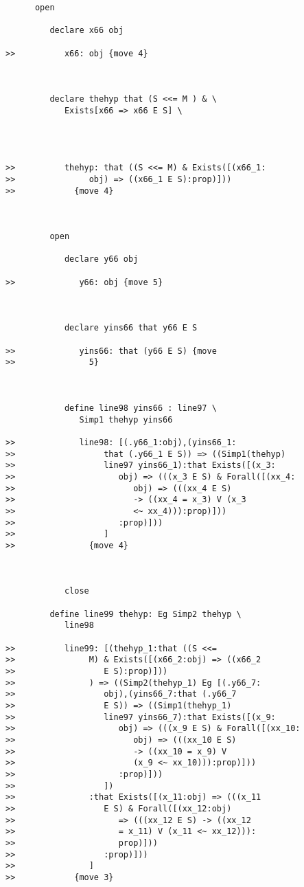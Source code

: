 \documentclass[12pt]{article}
\begin{document}
\begin{verbatim}
      open

         declare x66 obj

>>          x66: obj {move 4}



         declare thehyp that (S <<= M ) & \
            Exists[x66 => x66 E S] \
            



>>          thehyp: that ((S <<= M) & Exists([(x66_1:
>>               obj) => ((x66_1 E S):prop)]))
>>            {move 4}



         open

            declare y66 obj

>>             y66: obj {move 5}



            declare yins66 that y66 E S

>>             yins66: that (y66 E S) {move
>>               5}



            define line98 yins66 : line97 \
               Simp1 thehyp yins66

>>             line98: [(.y66_1:obj),(yins66_1:
>>                  that (.y66_1 E S)) => ((Simp1(thehyp)
>>                  line97 yins66_1):that Exists([(x_3:
>>                     obj) => (((x_3 E S) & Forall([(xx_4:
>>                        obj) => (((xx_4 E S)
>>                        -> ((xx_4 = x_3) V (x_3
>>                        <~ xx_4))):prop)]))
>>                     :prop)]))
>>                  ]
>>               {move 4}



            close

         define line99 thehyp: Eg Simp2 thehyp \
            line98

>>          line99: [(thehyp_1:that ((S <<=
>>               M) & Exists([(x66_2:obj) => ((x66_2
>>                  E S):prop)]))
>>               ) => ((Simp2(thehyp_1) Eg [(.y66_7:
>>                  obj),(yins66_7:that (.y66_7
>>                  E S)) => ((Simp1(thehyp_1)
>>                  line97 yins66_7):that Exists([(x_9:
>>                     obj) => (((x_9 E S) & Forall([(xx_10:
>>                        obj) => (((xx_10 E S)
>>                        -> ((xx_10 = x_9) V
>>                        (x_9 <~ xx_10))):prop)]))
>>                     :prop)]))
>>                  ])
>>               :that Exists([(x_11:obj) => (((x_11
>>                  E S) & Forall([(xx_12:obj)
>>                     => (((xx_12 E S) -> ((xx_12
>>                     = x_11) V (x_11 <~ xx_12))):
>>                     prop)]))
>>                  :prop)]))
>>               ]
>>            {move 3}




\end{verbatim}
\end{document}
